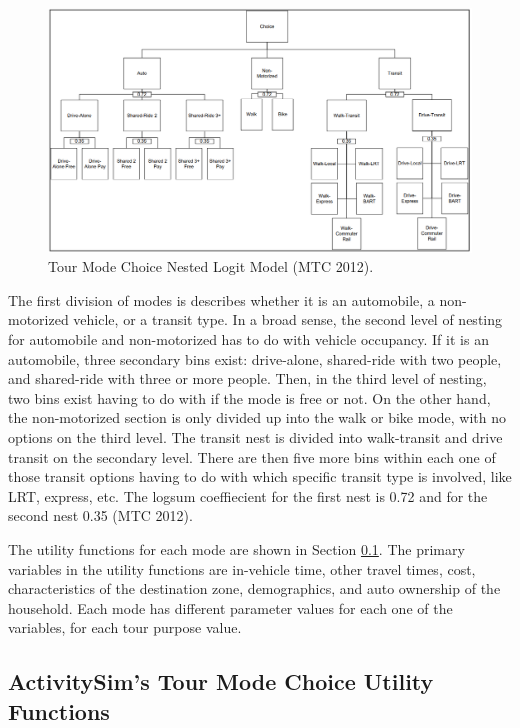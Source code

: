 \documentclass[12pt, oneside, openright]{byuthesis}
\begin{document}
\begin{figure}

{\centering \includegraphics[width=1\linewidth]{pics/tour_nest} 

}

\caption{Tour Mode Choice Nested Logit Model (MTC 2012).}\label{fig:fig1}
\end{figure}

The first division of modes is describes whether it is an automobile, a non-motorized vehicle, or a transit type. In a broad sense, the second level of nesting for automobile and non-motorized has to do with vehicle occupancy. If it is an automobile, three secondary bins exist: drive-alone, shared-ride with two people, and shared-ride with three or more people. Then, in the third level of nesting, two bins exist having to do with if the mode is free or not. On the other hand, the non-motorized section is only divided up into the walk or bike mode, with no options on the third level. The transit nest is divided into walk-transit and drive transit on the secondary level. There are then five more bins within each one of those transit options having to do with which specific transit type is involved, like LRT, express, etc. The logsum coeffiecient for the first nest is 0.72 and for the second nest 0.35 (MTC 2012).

The utility functions for each mode are shown in Section \ref{lit411}. The primary variables in the utility functions are in-vehicle time, other travel times, cost, characteristics of the destination zone, demographics, and auto ownership of the household. Each mode has different parameter values for each one of the variables, for each tour purpose value.

\hypertarget{lit411}{%
\subsection{ActivitySim's Tour Mode Choice Utility Functions}\label{lit411}}
\end{document}
